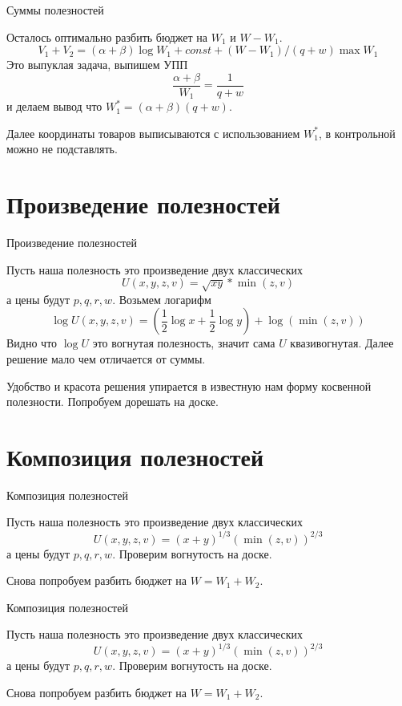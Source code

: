 \documentclass{beamer}
\begin{document}
\begin{frame}{Суммы полезностей}

Осталось оптимально разбить бюджет на $W_1$ и $W - W_1$.
$$ V_1 + V_2 = (\alpha + \beta) \log W_1 + const + (W-W_1)/(q + w) \max W_1$$
Это выпуклая задача, выпишем УПП
$$ \frac{\alpha + \beta}{W_1} = \frac{1}{q+w}$$
и делаем вывод что $W^*_1 = (\alpha + \beta)(q+w)$. 

Далее координаты товаров выписываются с использованием $W^*_1$, в контрольной можно не подставлять.
\end{frame}

\section{Произведение полезностей}

\begin{frame}{Произведение полезностей}
	
Пусть наша полезность это произведение двух классических
$$ U(x,y,z,v) = \sqrt{xy}*\min(z,v) $$
а цены будут $p,q,r,w$. Возьмем логарифм
$$ \log U(x,y,z,v) = (\frac{1}{2}\log x + \frac{1}{2}\log y) + \log(\min(z,v)) $$
Видно что $\log U$ это вогнутая полезность, значит сама $U$ квазивогнутая. Далее решение мало чем отличается от суммы.

Удобство и красота решения упирается в известную нам форму косвенной полезности. Попробуем дорешать на доске.
\end{frame}

\section{Композиция полезностей}

\begin{frame}{Композиция полезностей}
	
Пусть наша полезность это произведение двух классических
$$ U(x,y,z,v) = (x+y)^{1/3}(\min(z,v))^{2/3} $$
а цены будут $p,q,r,w$. Проверим вогнутость на доске. 

Снова попробуем разбить бюджет на $W = W_1 + W_2$.

\end{frame}

\begin{frame}{Композиция полезностей}
	
Пусть наша полезность это произведение двух классических
$$ U(x,y,z,v) = (x+y)^{1/3}(\min(z,v))^{2/3} $$
а цены будут $p,q,r,w$. Проверим вогнутость на доске. 

Снова попробуем разбить бюджет на $W = W_1 + W_2$.

\end{frame}
\end{document}
